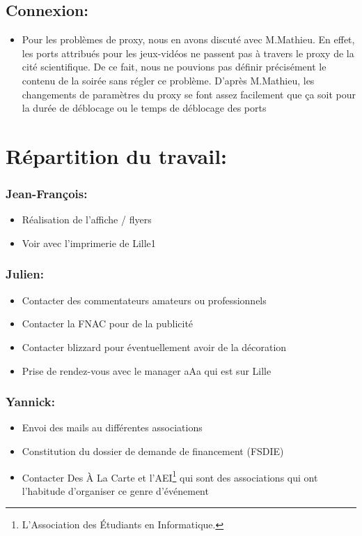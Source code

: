 \subsection{Connexion:}
\begin{itemize}
\item Pour les problèmes de proxy, nous en avons discuté avec M.Mathieu. En effet, les ports attribués pour les jeux-vidéos ne passent pas à travers le proxy de la cité scientifique. De ce fait, nous ne pouvions pas définir précisément le contenu de la soirée sans régler ce problème. D'après M.Mathieu, les changements de paramètres du proxy se font assez facilement que ça soit pour la durée de déblocage ou le temps de déblocage des ports
\end{itemize}

\section{Répartition du travail:}

\subsubsection{Jean-François:}
\begin{itemize}
\item Réalisation de l'affiche / flyers
\item Voir avec l'imprimerie de Lille1
\end{itemize}

\subsubsection{Julien:}
\begin{itemize}
\item Contacter des commentateurs amateurs ou professionnels
\item Contacter la FNAC pour de la publicité
\item Contacter blizzard pour éventuellement avoir de la décoration
\item Prise de rendez-vous avec le manager aAa qui est sur Lille
\end{itemize}

\subsubsection{Yannick:}
\begin{itemize}
\item Envoi des mails au différentes associations
\item Constitution du dossier de demande de financement (FSDIE)
\item Contacter \og Des À La Carte \fg{} et l'AEI\footnote{L'Association des Étudiants en Informatique.} qui sont des associations qui ont l'habitude d'organiser ce genre d’événement
\end{itemize}
